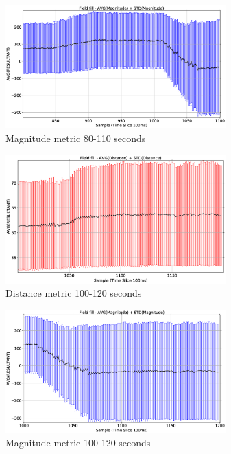\documentclass[10pt,journal,letterpaper,twoside]{IEEEtran}
\begin{document}
\begin{figure}
\begin{center}
\includegraphics[width=8.5cm]{figures/FIELDFILL-MAG-3}
\end{center}
\caption{Magnitude metric 80-110 seconds\label{emerge:FIELDFILL-MAG-3}}
\end{figure}

\begin{figure}
\begin{center}
\includegraphics[width=8.5cm]{figures/FIELDFILL-DIST-3b}
\end{center}
\caption{Distance metric 100-120 seconds\label{emerge:FIELDFILL-DIST-3b}}
\end{figure}

\begin{figure}
\begin{center}
\includegraphics[width=8.5cm]{figures/FIELDFILL-MAG-3b}
\end{center}
\caption{Magnitude metric 100-120 seconds\label{emerge:FIELDFILL-MAG-3b}}
\end{figure}
\end{document}
